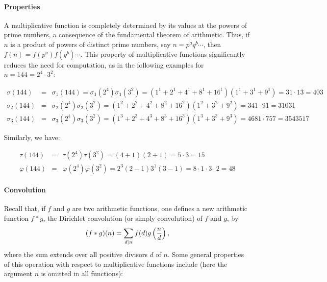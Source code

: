 \documentclass[12pt]{article}
\begin{document}
\paragraph{Properties}

A multiplicative function is completely determined by its values at the powers of prime numbers, a consequence of the fundamental theorem of arithmetic. Thus, if $n$ is a product of powers of distinct prime numbers, say $n=p^aq^b\cdots$, then $f(n)=f(p^a)f(q^b)\cdots$. This property of multiplicative functions significantly reduces the need for computation, as in the following examples for $n=144=2^4 \cdot 3^2$: 

\begin{eqnarray*}
\sigma(144) &=& \sigma_{1}(144)=\sigma_{1}(2^4)\sigma_{1}(3^2)= (1^1+2^1+4^1+8^1+16^1)(1^1+3^1+9^1)=31 \cdot 13=403 \\
\sigma_{2}(144) &=& \sigma_{2}(2^4)\sigma_{2}(3^2) = (1^2+2^2+4^2+8^2+16^2)(1^2+3^2+9^2)=341 \cdot 91=31031 \\
\sigma_{3}(144) &=& \sigma_{3}(2^{4})\sigma_{3}(3^{2}) = (1^3+2^3+4^3+8^3+16^3)(1^3+3^3+9^3)=4681 \cdot 757=3543517
\end{eqnarray*}

Similarly, we have: 

\begin{eqnarray*}
\tau(144) &=& \tau(2^4)\tau(3^2)=(4+1)(2+1)=5 \cdot 3=15 \\
\varphi(144) &=& \varphi(2^4)\varphi (3^2)=2^3(2-1)3^1(3-1)=8 \cdot 1 \cdot 3 \cdot 2=48
\end{eqnarray*}

\paragraph{Convolution}

Recall that, if $f$ and $g$ are two arithmetic functions, one defines a new arithmetic function $f*g$, the Dirichlet convolution (or simply convolution) of $f$ and $g$, by
\[
(f*g)(n) = \sum_{d\vert n} f(d)g \left( {n\over d} \right),
\]
where the sum extends over all positive divisors $d$ of $n$. Some general properties of this operation with respect to multiplicative functions include (here the argument $n$ is omitted in all functions): 
\end{document}
